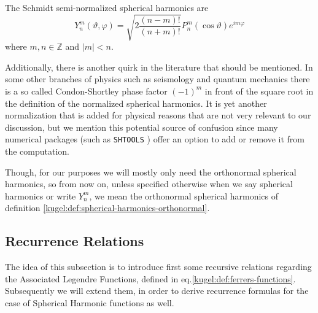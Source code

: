 \begin{definition}
  \label{kugel:def:spherical-harmonics-schmidt}
  The Schmidt semi-normalized spherical harmonics are
  \begin{equation*}
    Y^m_n(\vartheta, \varphi)
    = \sqrt{2 \frac{(n - m)!}{(n + m)!}}
      P^m_n(\cos \vartheta) e^{im\varphi}
  \end{equation*}
  where $m, n \in \mathbb{Z}$ and $|m| < n$.
\end{definition}

Additionally, there is another quirk in the literature that should be mentioned.
In some other branches of physics such as seismology and quantum mechanics there
is a so called Condon-Shortley phase factor $(-1)^m$ in front of the square root
in the definition of the normalized spherical harmonics. It is yet another
normalization that is added for physical reasons that are not very relevant to
our discussion, but we mention this potential source of confusion since many
numerical packages (such as \texttt{SHTOOLS} ) offer an
option to add or remove it from the computation.

Though, for our purposes we will mostly only need the orthonormal spherical
harmonics, so from now on, unless specified otherwise when we say spherical
harmonics or write $Y^m_n$, we mean the orthonormal spherical harmonics of
definition \ref{kugel:def:spherical-harmonics-orthonormal}.

\subsection{Recurrence Relations}
The idea of this subsection is to introduce first some recursive relations regarding the Associated Legendre Functions, defined in eq.\eqref{kugel:def:ferrers-functions}. Subsequently we will extend them, in order to derive recurrence formulas for the case of Spherical Harmonic functions as well. 
